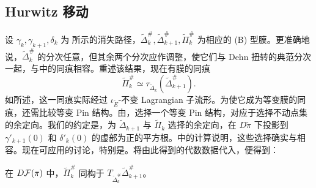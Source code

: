 \subsection{Hurwitz 移动}\label{sec:18i}
设 $\gamma_k,\gamma_{k+1},\delta_k$ 为 所示的消失路径，$\widetilde\Delta_k^\#,\widetilde\Delta_{k+1}^\#,\widetilde\Pi_k^\#$ 为相应的 (B) 型膜。更准确地说，$\widetilde\Delta_k^\#$ 的分次任意，但其余两个分次应作调整，使它们与 Dehn 扭转的典范分次一起，与中的同痕相容。重述该结果，现在有膜的同痕
\begin{equation}\label{eq:18.28}
\widetilde\Pi_k^\#\simeq\tau_{\widetilde\Delta_k}(\widetilde\Delta_{k+1}^\#).
\end{equation}
如所述，这一同痕实际经过 $\iota_{\widetilde E}$-不变 Lagrangian 子流形。为使它成为等变膜的同痕，还需比较等变 Pin 结构。由，选择一个等变 Pin 结构，对应于选择不动点集的余定向。我们的约定是，为 $\widetilde\Delta_{k+1}$ 与 $\widetilde\Pi_k$ 选择的余定向，在 $D\widetilde\pi$ 下投影到 $\gamma'_{k+1}(0)$ 和 $\delta'_k(0)$ 的虚部为正的平方根。中的计算说明，这些选择确实与相容。现在可应用的讨论，特别是。将由此得到的代数数据代入，便得到：

\begin{proposition}\label{st:18.23}
在 $D\mathcal F(\pi)$ 中，$\widetilde\Pi_k^\#$ 同构于 $T_{\widetilde\Delta_k^\#}\widetilde\Delta_{k+1}^\#$。
\end{proposition}
